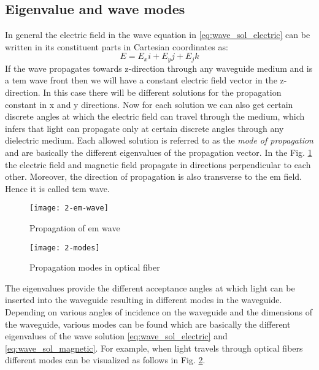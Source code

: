 \documentclass[../report.tex]{subfiles}
\begin{document}
		\subsection{Eigenvalue and wave modes}
In general the electric field in the wave equation in \ref{eq:wave_sol_electric} can be written in its constituent parts in Cartesian coordinates as:
\begin{equation}\label{eq:e_field_cart_cord}
E=E_{x}i+E_{y}j+E_{j}k
\end{equation}
If the wave propagates towards z-direction through any waveguide medium and is a \gls{tem} wave front then we will have a constant electric field vector in the z-direction. In this case there will be different solutions for the propagation constant in x and y directions. Now for each solution we can also get certain discrete angles at which the electric field can travel through the medium, which infers that light can propagate only at certain discrete angles through any dielectric medium. Each allowed solution is referred to as the \textit{mode of propagation} and are basically the different eigenvalues of the propagation vector. In the Fig. \ref{fig:2_em_wave} the electric field and magnetic field propagate in directions perpendicular to each other. Moreover, the direction of propagation is also transverse to the \gls{em} field. Hence it is called \gls{tem} wave.
\begin{figure}[H]
	\centering
	\texttt{[image: 2-em-wave]}
	\caption{Propagation of \gls{em} wave}
	\label{fig:2_em_wave}
\end{figure}
\begin{figure}[H]
	\centering
	\texttt{[image: 2-modes]}
	\caption{Propagation modes in optical fiber}
	\label{fig:2_modes}
\end{figure}
The eigenvalues provide the different acceptance angles at which light can be inserted into the waveguide resulting in different modes in the waveguide. Depending on various angles of incidence on the waveguide and the dimensions of the waveguide, various modes can be found which are basically the different eigenvalues of the wave solution \ref{eq:wave_sol_electric} and \ref{eq:wave_sol_magnetic}. For example, when light travels through optical fibers different modes can be visualized as follows in Fig. \ref{fig:2_modes}.
\end{document}
